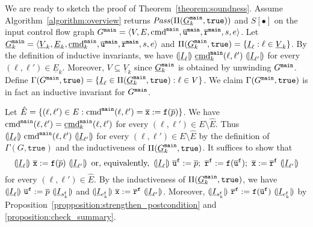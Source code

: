 We are ready to sketch the proof of Theorem~\ref{theorem:soundness}. 
Assume Algorithm~\ref{algorithm:overview} returns $\mathit{Pass} (\Pi (\underline{G}^{\mathtt{{main}}}_k, \mathtt{true}))$ and $S[\bullet]$ on the input control flow graph $G^{\mathtt{{main}}} =
\langle V, E, \textmd{cmd}^{\mathtt{{main}}}, \overline{\mathtt{u}}^{\mathtt{{main}}}, \overline{\mathtt{r}}^{\mathtt{{main}}},s,e \rangle$. Let $\underline{G}^{\mathtt{{main}}}_k = \langle \underline{V}_k, \underline{E}_k,
\underline{\textmd{cmd}}_k^{\mathtt{{main}}} , \overline{\mathtt{u}}^{\mathtt{{main}}}, \overline{\mathtt{r}}^{\mathtt{{main}}},s,e \rangle$ and $\Pi (\underline{G}^{\mathtt{{main}}}_k, \mathtt{true}) = \{ \underline{I}_{\ell}
: \ell \in \underline{V}_k \}$. By the definition of inductive invariants, we have
$\assert{\underline{I}_{\ell}}\ \underline{\textmd{cmd}}_k^\fun{main} (\ell, \ell')\ \assert{\underline{I}_{\ell'}}$
for every $(\ell, \ell') \in  \underline{E}_k$. Moreover, $V \subseteq  \underline{V}_k$ since
$\underline{G}^{\mathtt{{main}}}_k$ is obtained by unwinding $G^{\mathtt{{main}}}$. Define 
$\Gamma (G^{\mathtt{{main}}}, \mathtt{true}) = \{ \underline{I}_{\ell} \in \Pi (\underline{G}^{\mathtt{{main}}}_k,
\mathtt{true}) : \ell \in V \}$. We claim $\Gamma (G^{\mathtt{{main}}}, \mathtt{true})$
is in fact an inductive invariant for $G^{\mathtt{{main}}}$. 

Let $\hat{E} = \{ (\ell, \ell') \in E : \textmd{cmd}^{\mathtt{{main}}} (\ell, \ell') =
\overline{\mathtt{x}} := \mathtt{f} (\overline{p}) \}$. We have
$\textmd{cmd}^{\mathtt{{main}}} (\ell, \ell') = \underline{\textmd{cmd}}_k^{\mathtt{{main}}} (\ell, \ell')$ for every
$(\ell, \ell') \in E \setminus \hat{E}$. Thus $\assert{\underline{I}_{\ell}}\
\textmd{cmd}^\fun{main} (\ell, \ell')\ \assert{\underline{I}_{\ell'}}$ for every $(\ell,
\ell') \in E \setminus \hat{E}$ by the definition of $\Gamma (G,
\mathtt{true})$ and the inductiveness of $\Pi (\underline{G}^{\mathtt{{main}}}_k,
\mathtt{true})$. It suffices to show that
\begin{equation*}
  \assert{\underline{I}_{\ell}}\
  \overline{\mathtt{x}} := \mathtt{f} (\overline{p})
  \ \assert{\underline{I}_{\ell'}}
  \hspace{0.5em}
  \textmd{or, equivalently,}
  \hspace{0.5em}
  \assert{\underline{I}_{\ell}}\ 
  \overline{\mathtt{u}}^\fun{f} := \overline{p};\ 
  \mathtt{\overline{r}}^\fun{f} := \mathtt{f} (\overline{\mathtt{u}}^\fun{f});\ 
  \overline{\mathtt{x}} := \mathtt{\overline{r}}^\fun{f}
  \ \assert{\underline{I}_{\ell'}}
\end{equation*}
for every $(\ell, \ell') \in \hat{E}$. 
By the inductiveness of $\Pi (\underline{G}^{\mathtt{{main}}}_k, \mathtt{true})$, we have
$\assert{\underline{I}_{\ell}}\ \overline{\mathtt{u}}^\fun{f} := \overline{p}\
\assert{\underline{I}_{s_k^\fun{f}}}$ and
$\assert{\underline{I}_{e_k^\fun{f}}}\ \overline{\mathtt{x}} :=
\mathtt{\overline{r}}^\fun{f}\ \assert{\underline{I}_{\ell'}}$. 
Moreover,
$\assert{\underline{I}_{s_k^\mathtt{f}}}\
\mathtt{\overline{r}}^\fun{f} := \mathtt{f}
(\overline{\mathtt{u}}^\fun{f})\ \assert{\underline{I}_{e_k^\fun{f}}}$ 
by Proposition~\ref{propposition:strengthen_postcondition} and \ref{proposition:check_summary}.

